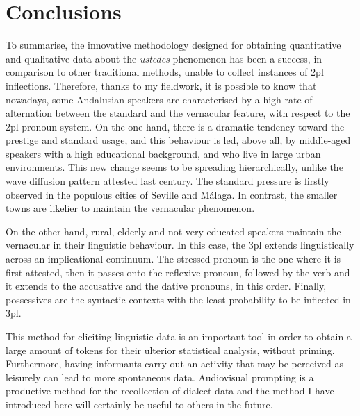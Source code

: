\documentclass[output=paper]{LSP/langsci}
\begin{document}
\section{Conclusions}
To summarise, the innovative methodology designed for obtaining quantitative and qualitative data about the \textit{ustedes} phenomenon has been a success, in comparison to other traditional methods, unable to collect instances of 2pl inflections. Therefore, thanks to my fieldwork, it is possible to know that nowadays, some Andalusian speakers are characterised by a high rate of alternation between the standard and the vernacular feature, with respect to the 2pl pronoun system. On the one hand, there is a dramatic tendency toward the prestige and standard usage, and this behaviour is led, above all, by middle-aged speakers with a high educational background, and who live in large urban environments. This new change seems to be spreading hierarchically, unlike the wave diffusion pattern attested last century. The standard pressure is firstly observed in the populous cities of Seville and Málaga. In contrast, the smaller towns are likelier to maintain the vernacular phenomenon.

On the other hand, rural, elderly and not very educated speakers maintain the vernacular in their linguistic behaviour. In this case, the 3pl extends linguistically across an implicational continuum. The stressed pronoun is the one where it is first attested, then it passes onto the reflexive pronoun, followed by the verb and it extends to the accusative and the dative pronouns, in this order. Finally, possessives are the syntactic contexts with the least probability to be inflected in 3pl.

This method for eliciting linguistic data is an important tool in order to obtain a large amount of tokens for their ulterior statistical analysis, without priming. Furthermore, having informants carry out an activity that may be perceived as leisurely can lead to more spontaneous data. Audiovisual prompting is a productive method for the recollection of dialect data and the method I have introduced here will certainly be useful to others in the future.

\printbibliography[heading=subbibliography,notkeyword=this]
\end{document}

